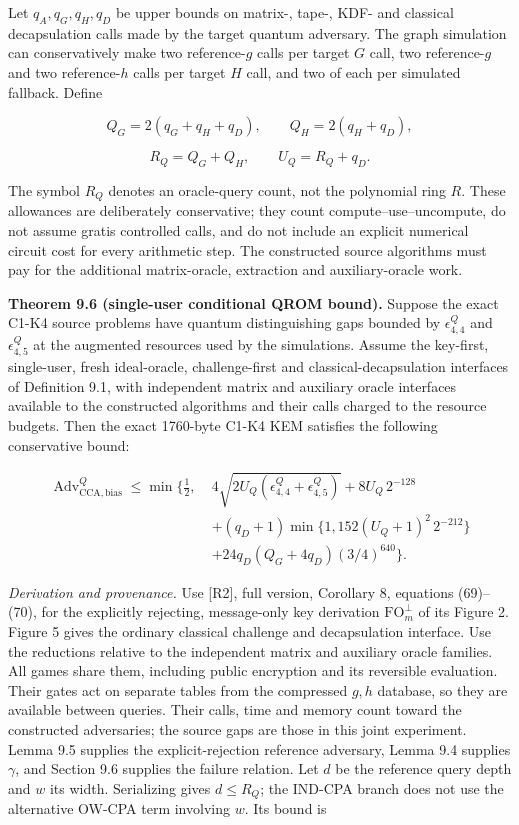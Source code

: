 \documentclass[
  11pt,
  a4paper,
  oneside]{report}
\begin{document}
Let \(q_A,q_G,q_H,q_D\) be upper bounds on matrix-, tape-, KDF- and
classical decapsulation calls made by the target quantum adversary. The
graph simulation can conservatively make two reference-\(g\) calls per
target \(G\) call, two reference-\(g\) and two reference-\(h\) calls per
target \(H\) call, and two of each per simulated fallback. Define

\[
Q_G=2(q_G+q_H+q_D),\qquad
Q_H=2(q_H+q_D),
\]

\[
R_Q=Q_G+Q_H,\qquad U_Q=R_Q+q_D.
\]

The symbol \(R_Q\) denotes an oracle-query count, not the polynomial
ring \(R\). These allowances are deliberately conservative; they count
compute--use--uncompute, do not assume gratis controlled calls, and do
not include an explicit numerical circuit cost for every arithmetic
step. The constructed source algorithms must pay for the additional
matrix-oracle, extraction and auxiliary-oracle work.

\textbf{Theorem 9.6 (single-user conditional QROM bound).} Suppose the
exact C1-K4 source problems have quantum distinguishing gaps bounded by
\(\epsilon_{4,4}^Q\) and \(\epsilon_{4,5}^Q\) at the augmented resources
used by the simulations. Assume the key-first, single-user, fresh
ideal-oracle, challenge-first and classical-decapsulation interfaces of
Definition 9.1, with independent matrix and auxiliary oracle interfaces
available to the constructed algorithms and their calls charged to the
resource budgets. Then the exact 1760-byte C1-K4 KEM satisfies the
following conservative bound:

\[
\boxed{\begin{aligned}
\operatorname{Adv}^{Q}_{\mathrm{CCA,bias}}
\le\min\biggl\{\frac12,\;&
4\sqrt{2U_Q(\epsilon_{4,4}^Q+\epsilon_{4,5}^Q)}
+8U_Q\,2^{-128}\\
&+(q_D+1)\min\{1,152(U_Q+1)^2\,2^{-212}\}\\
&+24q_D(Q_G+4q_D)(3/4)^{640}
\biggr\}.
\end{aligned}}
\]

\emph{Derivation and provenance.} Use {[}R2{]}, full version, Corollary
8, equations (69)--(70), for the explicitly rejecting, message-only key
derivation \(\mathrm{FO}^{\bot}_m\) of its Figure 2. Figure 5 gives the
ordinary classical challenge and decapsulation interface. Use the
reductions relative to the independent matrix and auxiliary oracle
families. All games share them, including public encryption and its
reversible evaluation. Their gates act on separate tables from the
compressed \(g,h\) database, so they are available between queries.
Their calls, time and memory count toward the constructed adversaries;
the source gaps are those in this joint experiment. Lemma 9.5 supplies
the explicit-rejection reference adversary, Lemma 9.4 supplies
\(\gamma\), and Section 9.6 supplies the failure relation. Let \(d\) be
the reference query depth and \(w\) its width. Serializing gives
\(d\le R_Q\); the IND-CPA branch does not use the alternative OW-CPA
term involving \(w\). Its bound is
\end{document}
